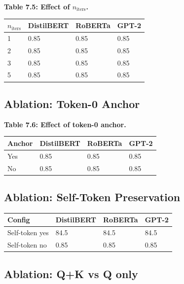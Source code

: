 \textbf{Table 7.5: Effect of $n_{\text{iters}}$.}

\begin{table}[H]
\centering
\small
\begin{tabular}{llll}
\toprule
\textbf{$n_{\text{iters}}$} & \textbf{DistilBERT} & \textbf{RoBERTa} & \textbf{GPT-2} \\
\midrule
1 & 0.85 & 0.85 & 0.85 \\
2 & 0.85 & 0.85 & 0.85 \\
3 & 0.85 & 0.85 & 0.85 \\
5 & 0.85 & 0.85 & 0.85 \\
\bottomrule
\end{tabular}
\end{table}

\subsection{Ablation: Token-0 Anchor}

\textbf{Table 7.6: Effect of token-0 anchor.}

\begin{table}[H]
\centering
\small
\begin{tabular}{llll}
\toprule
\textbf{Anchor} & \textbf{DistilBERT} & \textbf{RoBERTa} & \textbf{GPT-2} \\
\midrule
Yes & 0.85 & 0.85 & 0.85 \\
No & 0.85 & 0.85 & 0.85 \\
\bottomrule
\end{tabular}
\end{table}

\subsection{Ablation: Self-Token Preservation}

\begin{table}[H]
\centering
\small
\begin{tabular}{llll}
\toprule
\textbf{Config} & \textbf{DistilBERT} & \textbf{RoBERTa} & \textbf{GPT-2} \\
\midrule
Self-token yes & 84.5 & 84.5 & 84.5 \\
Self-token no & 0.85 & 0.85 & 0.85 \\
\bottomrule
\end{tabular}
\end{table}

\subsection{Ablation: Q+K vs Q only}

